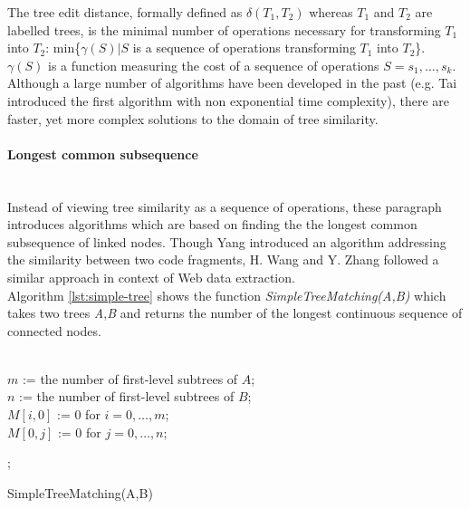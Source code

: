 \documentclass[12pt, notitlepage]{article}
\begin{document}
The tree edit distance, formally defined as $\delta(T_1,T_2)$ whereas $T_1$ and $T_2$ are labelled trees,
is the minimal number of operations necessary for transforming $T_1$ into $T_2$: min\{$\gamma(S)|S$ is a sequence of operations transforming $T_1$ into $T_2$\}. $\gamma(S)$ is a function measuring the cost of a sequence of operations $S=s_1,...,s_k$. \\
Although a large number of algorithms have been developed in the past (e.g. Tai\cite{tai} introduced the first algorithm with non exponential time complexity), there are faster, yet more complex solutions to the domain of tree similarity. 

\paragraph{Longest common subsequence} ~\\
Instead of viewing tree similarity as a sequence of operations, these paragraph introduces algorithms which are based on finding
the the longest common subsequence of linked nodes. 
Though Yang\cite{yang} introduced an algorithm addressing the similarity between two code fragments, H. Wang and Y. Zhang\cite{simple-tree-matching} followed a similar approach in context of Web data extraction.\\
Algorithm \ref{lst:simple-tree} shows the function \textit{SimpleTreeMatching(A,B)} which takes two trees \textit{A},\textit{B} and returns the number of the longest continuous sequence of connected nodes.\\ 
\\
\begin{algorithm}[H]
\SetAlgoLined
	$m$ := the number of first-level subtrees of $A$;\\
	$n$ := the number of first-level subtrees of $B$;\\
	$M[i,0]$ := 0 for $i=0,\ldots,m$;\\
	$M[0,j]$ := 0 for $j=0,\ldots,n$;\\
	
	
	;
\caption{SimpleTreeMatching(A,B)\label{lst:simple-tree}}
\end{algorithm}
\end{document}
